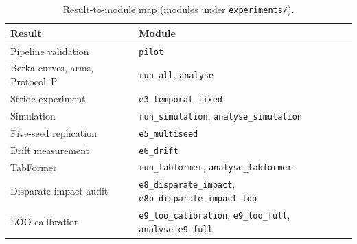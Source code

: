 \begin{table}[!t]
\caption{Result-to-module map (modules under \texttt{experiments/}).}
\label{tab:modules}
\centering\footnotesize\setlength{\tabcolsep}{4pt}
\begin{tabular}{p{} p{}}
\toprule
Result & Module \\
\midrule
Pipeline validation & \texttt{pilot} \\
Berka curves, arms, Protocol~P & \texttt{run\_all}, \texttt{analyse} \\
Stride experiment & \texttt{e3\_temporal\_fixed} \\
Simulation & \texttt{run\_simulation}, \texttt{analyse\_simulation} \\
Five-seed replication & \texttt{e5\_multiseed} \\
Drift measurement & \texttt{e6\_drift} \\
TabFormer & \texttt{run\_tabformer}, \texttt{analyse\_tabformer} \\
Disparate-impact audit & \texttt{e8\_disparate\_impact}, \texttt{e8b\_disparate\_impact\_loo} \\
LOO calibration & \texttt{e9\_loo\_calibration}, \texttt{e9\_loo\_full}, \texttt{analyse\_e9\_full} \\
\bottomrule
\end{tabular}
\end{table}

